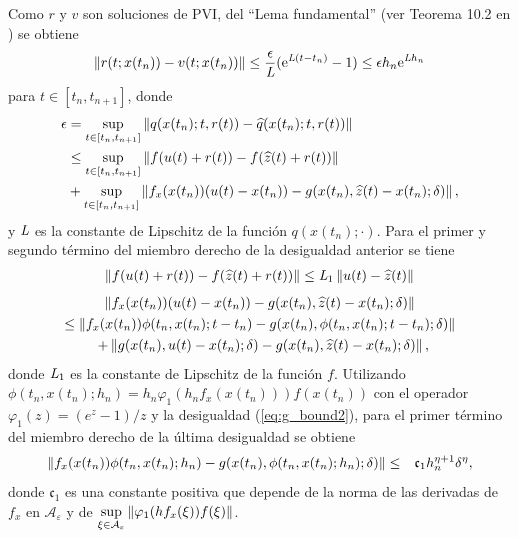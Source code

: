 Como $r$ y $v$ son soluciones de PVI, del ``Lema fundamental'' (ver Teorema 10.2 en \cite{hairer1993solving}) se obtiene
\begin{equation}
    \left\lVert r(t;x(t_n))-v(t;x(t_n)) \right\rVert \leq \frac{\epsilon}{\emph{L}}(\mathrm{e}^{\emph{L}(t-t_n)}-1)\leq \epsilon h_n \mathrm{e}^{\emph{L}h_n} \label{ineq:bound1}
\end{equation}
para $t\in[t_n,t_{n+1}]$, donde
\begin{align*}
    \epsilon & =  \sup\limits_{t\in[t_n,t_{n+1}]}\left\lVert q(x(t_n);t,r(t))-\widehat{q}(x(t_n);t,r(t)) \right\rVert\\
    &\leq \sup\limits_{t\in[t_n,t_{n+1}]} \left\lVert f(u(t)+r(t))-f(\widehat{z}(t)+r(t)) \right\rVert\\
    & + \sup\limits_{t\in[t_n,t_{n+1}]} \left\lVert f_x(x(t_n))(u(t)-x(t_n))-g(x(t_n),\widehat{z}(t)-x(t_n);\delta) \right\rVert,
\end{align*}
y $\emph{L}$ es la constante de Lipschitz de la función $q(x(t_n);\cdotp)$. Para el primer y segundo término del miembro derecho de la desigualdad anterior  se tiene
\begin{align}
    \left\lVert f(u(t)+r(t))-f(\widehat{z}(t)+r(t)) \right\rVert \leq  \emph{L}_1\left\lVert u(t)-\widehat{z}(t) \right\rVert \label{termino1}
\end{align}
\begin{multline}
    \left\lVert f_x(x(t_n))(u(t)-x(t_n))-g(x(t_n),\widehat{z}(t)-x(t_n);\delta) \right\rVert \\
    \leq \left\lVert f_x(x(t_n))\phi(t_n,x(t_n);t-t_n)-g(x(t_n),\phi(t_n,x(t_n);t-t_n);\delta)  \right\rVert \\
    \enspace+ \left\lVert g(x(t_n),u(t)-x(t_n);\delta)-g(x(t_n),\widehat{z}(t)-x(t_n);\delta) \right\rVert,
    \label{termino2}
\end{multline}
donde $\emph{L}_1$ es la constante de Lipschitz de la función $f$. Utilizando  $\phi(t_n,x(t_n);h_n)=h_n\varphi_1(h_n f_x(x(t_n)))f(x(t_n))$ con el operador $\varphi_1(z)=(e^z-1)/z$ y la desigualdad (\ref{eq:g_bound2}), para el primer término del miembro derecho de la última desigualdad se obtiene
\begin{eqnarray}
    \left\lVert  f_x(x(t_n))\phi(t_n,x(t_n);h_n) -g(x(t_n),\phi(t_n,x(t_n);h_n);\delta)  \right\rVert &  \leq & \mathfrak{c}_1 h_n^{\eta+1}\delta^{\eta}, \label{termino3}
\end{eqnarray}
donde  $\mathfrak{c}_1$ es una constante positiva que depende de la norma de las derivadas de $f_x$ en  $\mathcal{A}_\varepsilon$ y de $\sup\limits_{\xi\in \mathcal{A}_\varepsilon} \left\lVert \varphi_1(h f_x(\xi))f(\xi) \right\rVert$.

